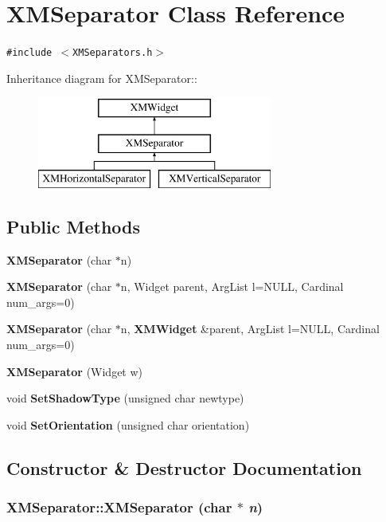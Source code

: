 \section{XMSeparator  Class Reference}
\label{classXMSeparator}
{\tt \#include $<$XMSeparators.h$>$}

Inheritance diagram for XMSeparator::\begin{figure}[H]
\begin{center}
\leavevmode
\includegraphics[height=3cm]{classXMSeparator}
\end{center}
\end{figure}
\subsection*{Public Methods}
\begin{CompactItemize}
\item 
{\bf XMSeparator} (char $\ast$n)
\item 
{\bf XMSeparator} (char $\ast$n, Widget parent, Arg\-List l=NULL, Cardinal num\_\-args=0)
\item 
{\bf XMSeparator} (char $\ast$n, {\bf XMWidget} \&parent, Arg\-List l=NULL, Cardinal num\_\-args=0)
\item 
{\bf XMSeparator} (Widget w)
\item 
void {\bf Set\-Shadow\-Type} (unsigned char newtype)
\item 
void {\bf Set\-Orientation} (unsigned char orientation)
\end{CompactItemize}


\subsection{Constructor \& Destructor Documentation}
\subsubsection{\setlength{\rightskip}{0pt plus 5cm}XMSeparator::XMSeparator (char $\ast$ {\em n})\hspace{0.3cm}{\tt  [inline]}}\label{classXMSeparator_a0}




